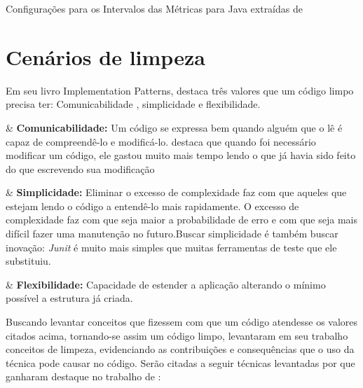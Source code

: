 \begin{table}[!ht]
	\begin{center}
		
	\caption{Configurações para os Intervalos das Métricas para Java extraídas de }
	\label{tab:good-metrics}
	\end{center}
	\end{table}
	\FloatBarrier
   


\section{Cenários de limpeza} 

Em seu livro Implementation Patterns,  destaca três valores que um código limpo precisa ter: Comunicabilidade , simplicidade e flexibilidade.
	
\begin{easylist}[itemize]

	& \textbf{Comunicabilidade:} Um código se expressa bem quando alguém que o lê é capaz de compreendê-lo e modificá-lo.  destaca que quando foi necessário modificar um código, ele gastou muito mais tempo lendo o que já havia sido feito do que escrevendo sua modificação 
		
	& \textbf{Simplicidade:} Eliminar o excesso de complexidade faz com que aqueles que estejam lendo o código a entendê-lo mais rapidamente. O excesso de complexidade faz com que seja maior a probabilidade de erro e com que seja mais difícil fazer uma manutenção no futuro.Buscar simplicidade é também buscar inovação: \textit{Junit} é muito mais simples que muitas ferramentas de teste que ele substituiu.

	& \textbf{Flexibilidade:} Capacidade de estender a aplicação alterando o mínimo possível a estrutura já criada.
		
\end{easylist}	

Buscando levantar conceitos que fizessem com que um código atendesse os valores citados acima, tornando-se assim um código limpo,  levantaram em seu trabalho conceitos de limpeza, evidenciando as contribuições e consequências que o uso da técnica pode causar no código. Serão citadas a seguir técnicas levantadas por  que ganharam destaque no trabalho de :

